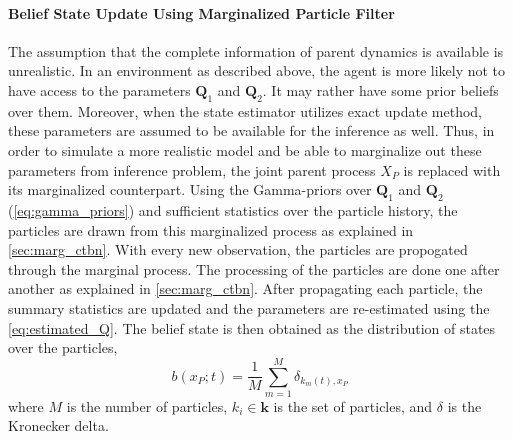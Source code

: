 \paragraph*{Belief State Update Using Marginalized Particle Filter}
\label{par:bs_partFilt}
The assumption that the complete information of parent dynamics is available is unrealistic. In an environment as described above, the agent is more likely not to have access to the parameters $ \textbf{Q}_1 $ and $ \textbf{Q}_2 $. It may rather have some prior beliefs over them. Moreover, when the state estimator utilizes exact update method, these parameters are assumed to be available for the inference as well. Thus, in order to simulate a more realistic model and be able to marginalize out these parameters from inference problem, the joint parent process $ X_P $ is replaced with its marginalized counterpart. Using the Gamma-priors over $ \textbf{Q}_1 $ and $ \textbf{Q}_2 $ (\autoref{eq:gamma_priors}) and sufficient statistics over the particle history, the particles are drawn from this marginalized process as explained in \cref{sec:marg_ctbn}. With every new observation, the particles are propogated through the marginal process. The processing of the particles are done one after another as explained in \cref{sec:marg_ctbn}. After propagating each particle, the summary statistics are updated and the parameters are re-estimated using the \autoref{eq:estimated_Q}. The belief state is then obtained as the distribution of states over the particles,
\begin{equation}
b(x_P; t) = \frac{1}{M} \sum_{m=1}^{M} \delta_{k_m(t), x_P}
\label{eq:belief_over_particles}
\end{equation}
where $ M $ is the number of particles, $ k_i \in \textbf{k} $ is the set of particles, and $\delta$ is the Kronecker delta.

